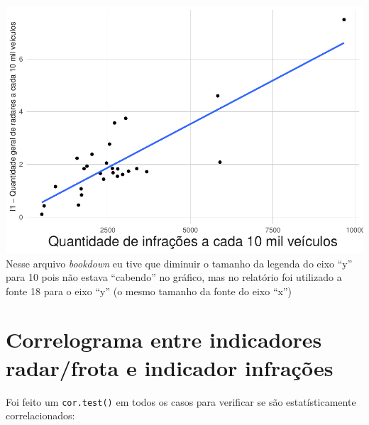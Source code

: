 \documentclass[
]{book}
\begin{document}
\includegraphics{RelatorioVelocidades_files/figure-latex/unnamed-chunk-24-1.pdf}
Nesse arquivo \emph{bookdown} eu tive que diminuir o tamanho da legenda do eixo ``y'' para 10 pois não estava ``cabendo'' no gráfico, mas no relatório foi utilizado a fonte 18 para o eixo ``y'' (o mesmo tamanho da fonte do eixo ``x'')

\section{Correlograma entre indicadores radar/frota e indicador infrações}\label{correlograma-entre-indicadores-radarfrota-e-indicador-infrauxe7uxf5es}

Foi feito um \texttt{cor.test()} em todos os casos para verificar se são estatísticamente correlacionados:
\end{document}
